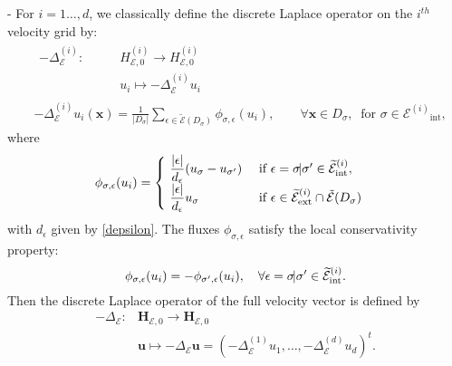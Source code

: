 \documentclass{amsart}
\numberwithin{equation}{section}
\begin{document}
\medskip
{} - For $i=1 \ldots, d$, we classically define the discrete Laplace operator on the $i^{th}$ velocity grid by:
\begin{align}
  &
\begin{array}{l|l}
-\Delta_{{\mathcal E}}^{(i)} : \quad
& \quad
{H_{{{\mathcal E}},0}^{(i)}}  \longrightarrow  {H_{{{\mathcal E}},0}^{(i)}}
\\ & \displaystyle \quad
{u_i} \longmapsto - \Delta_{{\mathcal E}}^{(i)}{u_i}  
\end{array} \nonumber \\
& 
- \Delta_{{\mathcal E}}^{(i)}{u_i} ({{\boldsymbol x}})=\frac{ 1}{ \vert D_{{\sigma}} \vert}\sum_{{\epsilon}\in\tilde{{\mathcal E}}(D_{{\sigma}})} 
\phi_{{{\sigma}},{\epsilon}}({u_i}),\qquad \forall {{\boldsymbol x}}\in D_{{\sigma}},\ 
\mbox{ for } {{\sigma}} \in {\mathcal {E}^{(i)}}_\operatorname{int}, \label{eq:lapi}
\end{align}
where
\begin{align}
&\displaystyle
\phi_{{{\sigma}},{\epsilon}}({u_i})=
\begin{cases}
\ \dfrac{\vert{\epsilon}\vert}{d_{\epsilon}} (u_{{\sigma}}-u_{{{\sigma}}'}) &\mbox{ if } {\epsilon}= {{\sigma}}\! \vert{{\sigma}}' 
 \in {{{\widetilde {{\mathcal E}}}^{(i)}_{{\rm int}}}},\\[1ex]
\ \dfrac{\vert{\epsilon}\vert}{d_{\epsilon}} u_{{\sigma}} &\mbox{ if } {\epsilon} \in{{{\widetilde {{\mathcal E}}}^{(i)}_{{\rm ext}}}}\cap\tilde{{\mathcal E}}(D_{{\sigma}})
\end{cases}
\end{align}
with $d_{\epsilon}$ given by \eqref{depsilon}.
The fluxes $\phi_{{{\sigma}},{\epsilon}}$ satisfy the local conservativity property: 
\begin{equation}
\label{conservdiff}
\phi_{{{\sigma}},{\epsilon}}({u_i})=-\phi_{{{\sigma}}',{\epsilon}}({u_i}),\quad\forall {\epsilon}={{\sigma}}\!\vert{{\sigma}}' \in{{{\widetilde {{\mathcal E}}}^{(i)}_{{\rm int}}}}.
\end{equation}
Then the discrete Laplace operator of the full velocity vector is defined by  
\begin{equation}
 \begin{array}{ll}
  -\Delta_{{\mathcal E}}:  & {{\mathbf{H}_{{{\mathcal E}},0}}} \longrightarrow {{\mathbf{H}_{{{\mathcal E}},0}}} \\
  & {{\boldsymbol u}} \mapsto -\Delta_{{\mathcal E}}{{\boldsymbol u}} = (-\Delta_{{\mathcal E}}^{(1)} u_1,\ldots, -\Delta_{{\mathcal E}}^{(d)} u_d)^t.
\end{array}
\end{equation}
\end{document}
